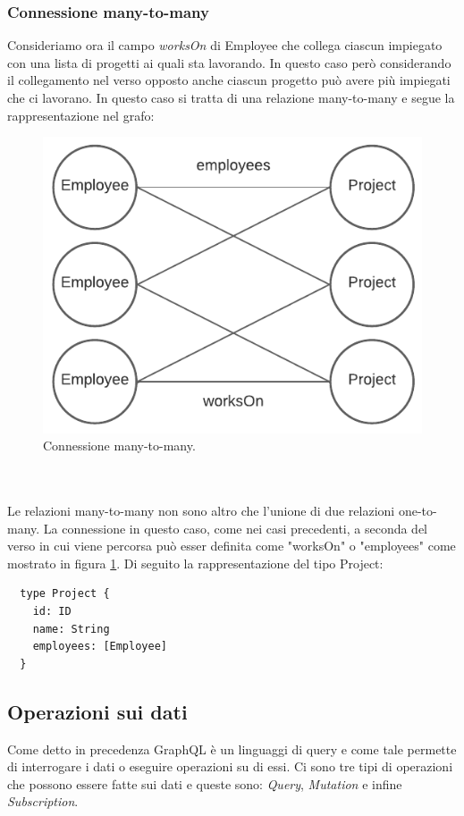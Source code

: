 \subsubsection*{Connessione many-to-many}
Consideriamo ora il campo \textit{worksOn} di Employee che collega ciascun impiegato con una lista di progetti ai quali sta lavorando. In questo caso però considerando il collegamento nel verso opposto anche ciascun progetto può avere più impiegati che ci lavorano. In questo caso si tratta di una relazione many-to-many e segue la rappresentazione nel grafo:
\begin{figure}[!h]
\centering
\includegraphics[width=0.4\linewidth]{immagini/many_to_many.pdf}
\caption{Connessione many-to-many.}
\label{many-to-many}
\end{figure}
\\ \\
Le relazioni many-to-many non sono altro che l'unione di due relazioni one-to-many.
La connessione in questo caso, come nei casi precedenti, a seconda del verso in cui viene percorsa può esser definita come "worksOn" o "employees" come mostrato in figura \ref{many-to-many}. Di seguito la rappresentazione del tipo Project:
\begin{verbatim}
  type Project {
    id: ID
    name: String
    employees: [Employee]
  }
\end{verbatim}
\subsection*{Operazioni sui dati}
Come detto in precedenza GraphQL è un linguaggi di query e come tale permette di interrogare i dati o eseguire operazioni su di essi. Ci sono tre tipi di operazioni che possono essere fatte sui dati e queste sono: \textit{Query}, \textit{Mutation} e infine \textit{Subscription}.
